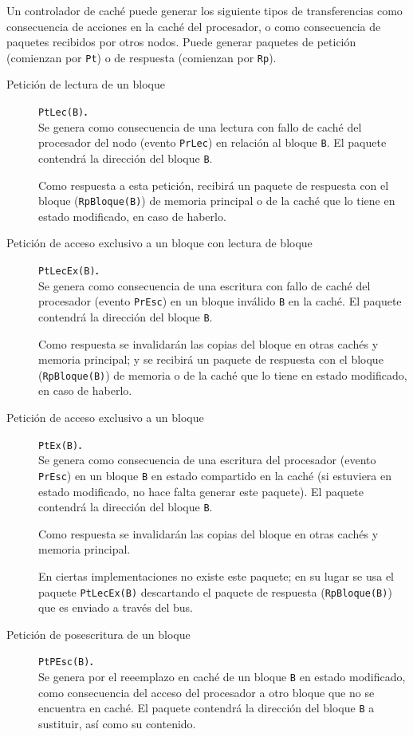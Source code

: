 Un controlador de caché puede generar los siguiente tipos de transferencias como consecuencia de acciones en la caché del procesador, o como consecuencia de paquetes recibidos por otros nodos. Puede generar paquetes de petición (comienzan por \verb|Pt|) o de respuesta (comienzan por \verb|Rp|).
\begin{description}
    \item [Petición de lectura de un bloque] \verb|PtLec(B)|\textbf{.}~\\
        Se genera como consecuencia de una lectura con fallo de caché del procesador del nodo (evento \verb|PrLec|) en relación al bloque \verb|B|. El paquete contendrá la dirección del bloque \verb|B|.

        Como respuesta a esta petición, recibirá un paquete de respuesta con el bloque (\verb|RpBloque(B)|) de memoria principal o de la caché que lo tiene en estado modificado, en caso de haberlo.
    \item [Petición de acceso exclusivo a un bloque con lectura de bloque] \verb|PtLecEx(B)|\textbf{.}~\\
        Se genera como consecuencia de una escritura con fallo de caché del procesador (evento \verb|PrEsc|) en un bloque inválido \verb|B| en la caché. El paquete contendrá la dirección del bloque \verb|B|.

        Como respuesta se invalidarán las copias del bloque en otras cachés y memoria principal; y se recibirá un paquete de respuesta con el bloque (\verb|RpBloque(B)|) de memoria o de la caché que lo tiene en estado modificado, en caso de haberlo.
    \item [Petición de acceso exclusivo a un bloque] \verb|PtEx(B)|\textbf{.}~\\
        Se genera como consecuencia de una escritura del procesador (evento \verb|PrEsc|) en un bloque \verb|B| en estado compartido en la caché (si estuviera en estado modificado, no hace falta generar este paquete). El paquete contendrá la dirección del bloque \verb|B|.

        Como respuesta se invalidarán las copias del bloque en otras cachés y memoria principal.

        En ciertas implementaciones no existe este paquete; en su lugar se usa el paquete \verb|PtLecEx(B)| descartando el paquete de respuesta (\verb|RpBloque(B)|) que es enviado a través del bus.
    \item [Petición de posescritura de un bloque] \verb|PtPEsc(B)|\textbf{.}~\\
        Se genera por el reeemplazo en caché de un bloque \verb|B| en estado modificado, como consecuencia del acceso del procesador a otro bloque que no se encuentra en caché. El paquete contendrá la dirección del bloque \verb|B| a sustituir, así como su contenido.


\end{description}
